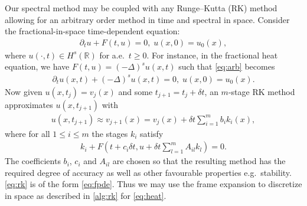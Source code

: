 \documentclass[10pt,a4paper]{article}
\numberwithin{equation}{section}
\begin{document}
Our spectral method may be coupled with any Runge--Kutta (RK) method allowing for an arbitrary order method in time and spectral in space. Consider the fractional-in-space time-dependent equation:
\begin{align}
\partial_t u + F(t, u) = 0,\; u(x,0) = u_0(x), \label{eq:arb}
\end{align}
where $u(\cdot, t) \in H^s(\mathbb{R})$ for a.e.~$t \geq 0$. For instance, in the fractional heat equation, we have $F(t,u) =  (-\Delta)^s u(x,t)$ such that \cref{eq:arb} becomes
\begin{align}
\partial_t  u(x,t) + (-\Delta)^s u(x,t) = 0,\; u(x,0) = u_0(x). \label{eq:heat}
\end{align}
Now given $u(x, t_j) = v_j(x)$ and some $t_{j+1} = t_j + \delta t$, an $m$-stage RK method approximates $u(x, t_{j+1})$ with
\begin{align}
u(x, t_{j+1}) \approx v_{j+1}(x) = v_j(x) + \delta t \sum_{i=1}^m b_i k_i(x),
\label{eq:rk2}
\end{align}
where for all $1 \leq i \leq m$ the stages $k_i$ satisfy
\begin{align}
k_i + F\left(t + c_i \delta t, u + \delta t \sum_{l=1}^m A_{il} k_l \right) = 0.
\label{eq:rk}
\end{align}
The coefficients $b_i$, $c_i$ and $A_{il}$ are chosen so that the resulting method has the required degree of accuracy as well as other favourable properties e.g.~stability. \cref{eq:rk} is of the form \cref{eq:fpde}. Thus we may use the frame expansion to discretize in space as described in \cref{alg:rk} for \cref{eq:heat}.
\end{document}
